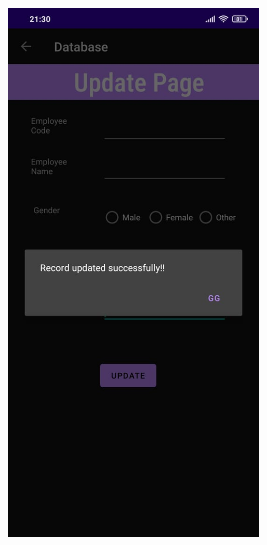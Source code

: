 \documentclass[12pt,letterpaper]{article}
\begin{document}
\begin{figure}
    \centering
    \includegraphics[height=14cm, keepaspectratio]{Outputs/OP8.jpeg}
\end{figure}

\newpage
\end{document}
